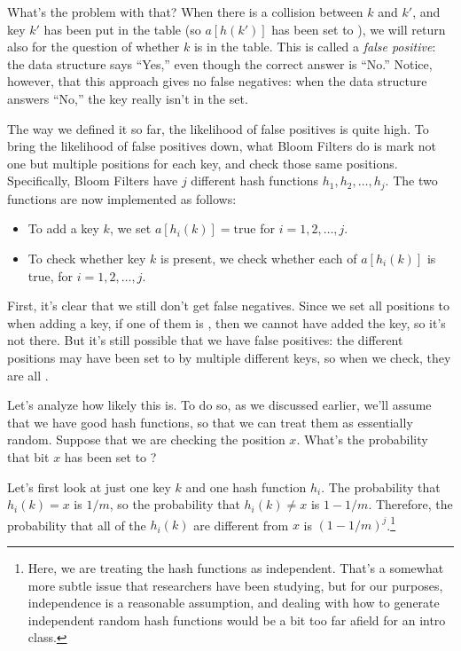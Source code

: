 What's the problem with that? When there is a collision between $k$
and $k'$, and key $k'$ has been put in the table (so $a[h(k')]$ has
been set to ), we will return  also for the
question of whether $k$ is in the table.
This is called a \emph{false positive}: the data structure says
``Yes,'' even though the correct answer is ``No.''
Notice, however, that this approach gives no false negatives: when the
data structure answers ``No,'' the key really isn't in the set.

The way we defined it so far, the likelihood of false positives is
quite high. To bring the likelihood of false positives down, what
Bloom Filters do is mark not one but multiple positions for each key,
and check those same positions.
Specifically, Bloom Filters have $j$ different hash functions $h_1,
h_2, \ldots, h_j$. The two functions are now implemented as follows:
\begin{itemize}
\item To add a key $k$, we set $a[h_i(k)] = \text{true}$ for $i=1, 2,
  \ldots, j$.
\item To check whether key $k$ is present, we check whether each of
  $a[h_i(k)]$ is true, for $i=1, 2, \ldots, j$.
\end{itemize}

First, it's clear that we still don't get false negatives. Since we
set all positions to  when adding a key, if one of them is
, then we cannot have added the key, so it's not there.
But it's still possible that we have false positives: the different
positions may have been set to  by multiple different keys,
so when we check, they are all .

Let's analyze how likely this is. To do so, as we discussed earlier,
we'll assume that we have good hash functions, so that we can treat
them as essentially random. Suppose that we are checking the position
$x$. What's the probability that bit $x$ has been set to ?

Let's first look at just one key $k$ and one hash function $h_i$.
The probability that $h_i(k) = x$ is $1/m$, so the probability that
$h_i(k) \neq x$ is $1-1/m$. Therefore, the probability that all of the
$h_i(k)$ are different from $x$ is $(1-1/m)^j$.\footnote{%
Here, we are treating the hash functions as independent. 
That's a somewhat more subtle issue  that researchers have been
studying, but for our purposes, independence is a reasonable
assumption, and dealing with how to generate independent random hash
functions would be a bit too far afield for an intro class.}

